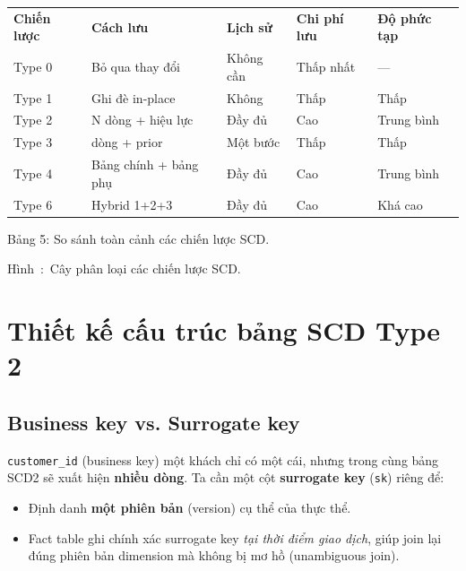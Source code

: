 \documentclass[12pt]{article}
\newcounter{hinh}
\newcommand{\capfig}[1]{%
  \refstepcounter{hinh}%
    Hình~\thehinh:~#1
}
\begin{document}
\noindent
\begin{longtable}{@{}>{\RaggedRight\arraybackslash}p{1.9cm}>{\RaggedRight\arraybackslash}p{4.4cm}>{\RaggedRight\arraybackslash}p{2.3cm}>{\RaggedRight\arraybackslash}p{2.3cm}>{\RaggedRight\arraybackslash}p{2.4cm}@{}}
\rowcolor{rowLavender}
\textbf{Chiến lược} & \textbf{Cách lưu} & \textbf{Lịch sử} & \textbf{Chi phí lưu} & \textbf{Độ phức tạp} \\
\addlinespace[3pt]
\endhead
Type 0 & Bỏ qua thay đổi        & Không cần & Thấp nhất & --- \\
\addlinespace[3pt]
Type 1 & Ghi đè in-place        & Không     & Thấp      & Thấp \\
\addlinespace[3pt]
Type 2 & N dòng + hiệu lực      & Đầy đủ    & Cao       & Trung bình \\
\addlinespace[3pt]
Type 3 & 1 dòng + prior         & Một bước  & Thấp      & Thấp \\
\addlinespace[3pt]
Type 4 & Bảng chính + bảng phụ  & Đầy đủ    & Cao       & Trung bình \\
\addlinespace[3pt]
Type 6 & Hybrid 1+2+3           & Đầy đủ    & Cao       & Khá cao \\
\end{longtable}

\begin{captionbelowboxaivn}
Bảng 5: So sánh toàn cảnh các chiến lược SCD.
\end{captionbelowboxaivn}



\begin{figurecaptionmodern}
\capfig{Cây phân loại các chiến lược SCD.}
\end{figurecaptionmodern}

\section{Thiết kế cấu trúc bảng SCD Type 2}

\subsection{Business key vs. Surrogate key}

\texttt{customer\_id} (business key) một khách chỉ có một cái, nhưng trong cùng bảng SCD2 sẽ xuất hiện \textbf{nhiều dòng}. Ta cần một cột \textbf{surrogate key} (\texttt{sk}) riêng để:
\begin{itemize}
    \item Định danh \textbf{một phiên bản} (version) cụ thể của thực thể.
    \item Fact table ghi chính xác surrogate key \emph{tại thời điểm giao dịch}, giúp join lại đúng phiên bản dimension mà không bị mơ hồ (unambiguous join).
\end{itemize}
\end{document}
